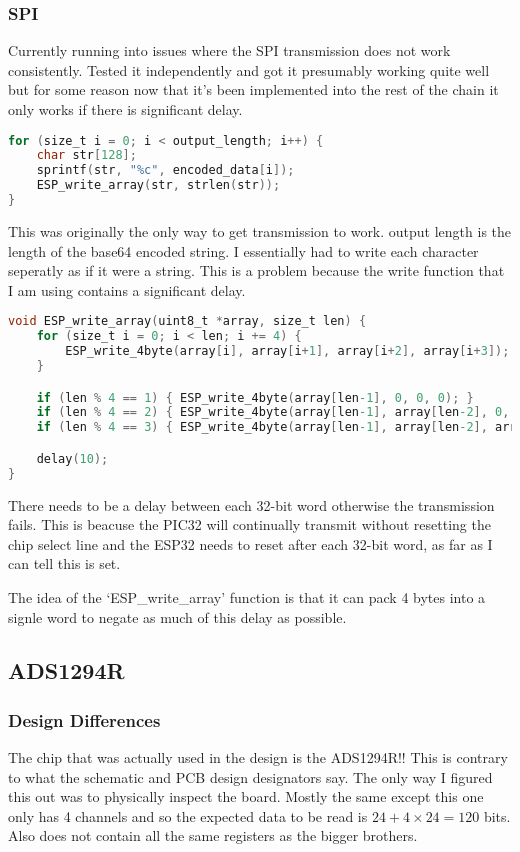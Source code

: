 \subsubsection{SPI}
Currently running into issues where the SPI transmission does not work consistently.
Tested it independently and got it presumably working quite well but for some reason
now that it's been implemented into the rest of the chain it only works if there is
significant delay.

\begin{lstlisting}[language=C]
for (size_t i = 0; i < output_length; i++) {
    char str[128];
    sprintf(str, "%c", encoded_data[i]);
    ESP_write_array(str, strlen(str));
}
\end{lstlisting}

This was originally the only way to get transmission to work.
output length is the length of the base64 encoded string.
I essentially had to write each character seperatly as if it were a string.
This is a problem because the write function that I am using contains a significant delay.

\begin{lstlisting}[language=C]
void ESP_write_array(uint8_t *array, size_t len) {
    for (size_t i = 0; i < len; i += 4) {
        ESP_write_4byte(array[i], array[i+1], array[i+2], array[i+3]);
    }

    if (len % 4 == 1) { ESP_write_4byte(array[len-1], 0, 0, 0); }
    if (len % 4 == 2) { ESP_write_4byte(array[len-1], array[len-2], 0, 0); }
    if (len % 4 == 3) { ESP_write_4byte(array[len-1], array[len-2], array[len-3], 0); }

    delay(10);
}
\end{lstlisting}

There needs to be a delay between each 32-bit word otherwise the transmission fails.
This is beacuse the PIC32 will continually transmit without resetting the chip select line
and the ESP32 needs to reset after each 32-bit word, as far as I can tell this is set.

The idea of the `ESP\_write\_array' function is that it can pack 4 bytes into a signle word
to negate as much of this delay as possible.


\subsection{ADS1294R}
\subsubsection{Design Differences}
The chip that was actually used in the design is the ADS1294R!!
This is contrary to what the schematic and PCB design designators say.
The only way I figured this out was to physically inspect the board.
Mostly the same except this one only has 4 channels and so the expected data
to be read is \(24 + 4 \times 24 = 120\) bits.
Also does not contain all the same registers as the bigger brothers.

